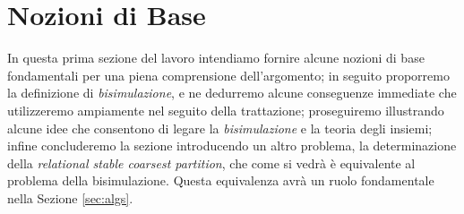 \section{Nozioni di Base}
\label{sec:base}
In questa prima sezione del lavoro intendiamo fornire alcune nozioni di base fondamentali per una piena comprensione dell'argomento; in seguito proporremo la definizione di \emph{bisimulazione}, e ne dedurremo alcune conseguenze immediate che utilizzeremo ampiamente nel seguito della trattazione; proseguiremo illustrando alcune idee che consentono di legare la \emph{bisimulazione} e la teoria degli insiemi; infine concluderemo la sezione introducendo un altro problema, la determinazione della \emph{relational stable coarsest partition}, che come si vedrà è equivalente al problema della bisimulazione. Questa equivalenza avrà un ruolo fondamentale nella Sezione \ref{sec:algs}.








